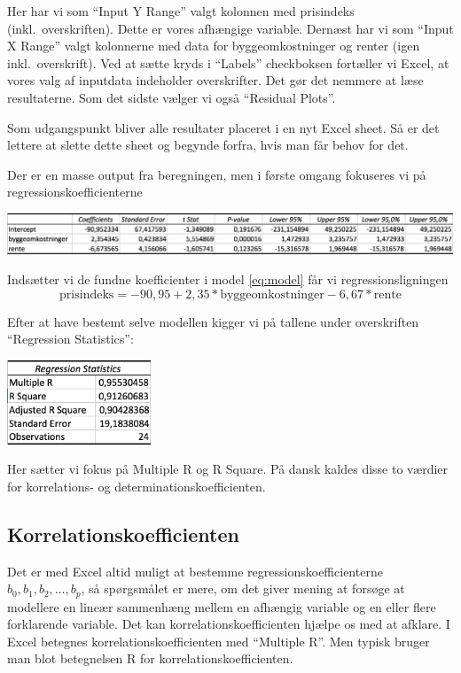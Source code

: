 Her har vi som ``Input Y Range'' valgt kolonnen med prisindeks (inkl.\ overskriften). Dette er vores afhængige variable. Dernæst har vi som ``Input X Range'' valgt kolonnerne med data for byggeomkostninger og renter (igen inkl.\ overskrift). Ved at sætte kryds i ``Labels'' checkboksen fortæller vi Excel, at vores valg af inputdata indeholder overskrifter. Det gør det nemmere at læse resultaterne. Som det sidste vælger vi også ``Residual Plots''.

Som udgangspunkt bliver alle resultater placeret i en nyt Excel sheet. Så er det lettere at slette dette sheet og begynde forfra, hvis man får behov for det.

Der er en masse output fra beregningen, men i første omgang fokuseres vi på regressionskoefficienterne
\begin{center}\label{figure:regressionCoefficients}
\includegraphics[width=16cm]{regression/images/regressionCoefficients.JPG}
\end{center}
Indsætter vi de fundne koefficienter i model \ref{eq:model} får vi regressionsligningen
\begin{displaymath}
  \textrm{prisindeks} = -90,95 + 2,35 * \textrm{byggeomkostninger} - 6,67 * \textrm{rente}
\end{displaymath}

Efter at have bestemt selve modellen kigger vi på tallene under overskriften ``Regression Statistics'':
\begin{center}\label{tabel:resultat}
\includegraphics[height=2.5cm]{regression/images/resultat.JPG}
\end{center}
Her sætter vi fokus på Multiple R og R Square. På dansk kaldes disse to værdier for korrelations- og determinationskoefficienten.

\subsection{Korrelationskoefficienten}
Det er med Excel altid muligt at bestemme regressionskoefficienterne \(b_0,b_1,b_2,\ldots,b_p\), så spørgsmålet er mere, om det giver mening at forsøge at modellere en lineær sammenhæng mellem en afhængig variable og en eller flere forklarende variable. Det kan korrelationskoefficienten hjælpe os med at afklare. I Excel betegnes korrelationskoefficienten med ``Multiple R''. Men typisk bruger man blot betegnelsen R for korrelationskoefficienten.

